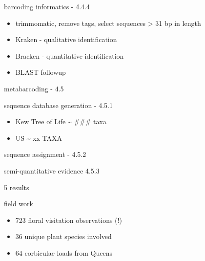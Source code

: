 \documentclass[
  ignorenonframetext,
]{beamer}
\providecommand{\tightlist}{%
  \setlength{\itemsep}{0pt}\setlength{\parskip}{0pt}}
\begin{document}
\begin{frame}{barcoding informatics - 4.4.4}
\protect\hypertarget{barcoding-informatics---4.4.4}{}
\begin{itemize}
\tightlist
\item
  trimmomatic, remove tags, select sequences \textgreater{} 31 bp in
  length
\item
  Kraken - qualitative identification
\item
  Bracken - quantitative identification
\item
  BLAST followup
\end{itemize}
\end{frame}

\begin{frame}{metabarcoding - 4.5}
\protect\hypertarget{metabarcoding---4.5}{}
\end{frame}

\begin{frame}{sequence database generation - 4.5.1}
\protect\hypertarget{sequence-database-generation---4.5.1}{}
\begin{itemize}
\tightlist
\item
  Kew Tree of Life \textasciitilde{} \#\#\# taxa
\item
  US \textasciitilde{} xx TAXA
\end{itemize}
\end{frame}

\begin{frame}{sequence assignment - 4.5.2}
\protect\hypertarget{sequence-assignment---4.5.2}{}
\end{frame}

\begin{frame}{semi-quantitative evidence 4.5.3}
\protect\hypertarget{semi-quantitative-evidence-4.5.3}{}
\end{frame}

\begin{frame}{5 \textbar{} results}
\protect\hypertarget{results}{}
\end{frame}

\begin{frame}{field work}
\protect\hypertarget{field-work}{}
\begin{itemize}
\tightlist
\item
  723 floral visitation observations (!)
\item
  36 unique plant species involved
\item
  64 corbiculae loads from Queens
\end{itemize}

\note{}
\end{frame}
\end{document}
